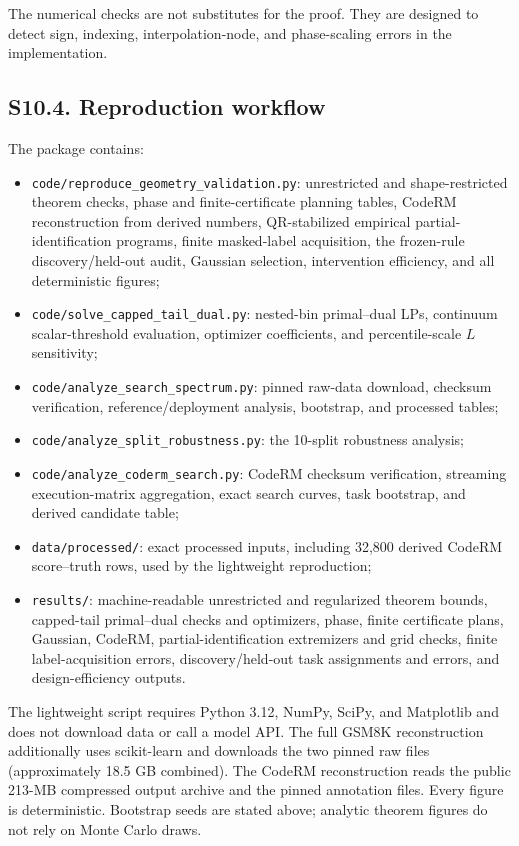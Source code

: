 The numerical checks are not substitutes for the proof. They are designed to detect sign, indexing, interpolation-node, and phase-scaling errors in the implementation.

\subsection*{S10.4. Reproduction workflow}

The package contains:
\begin{itemize}
\item \texttt{code/reproduce\_geometry\_validation.py}: unrestricted and shape-restricted theorem checks, phase and finite-certificate planning tables, CodeRM reconstruction from derived numbers, QR-stabilized empirical partial-identification programs, finite masked-label acquisition, the frozen-rule discovery/held-out audit, Gaussian selection, intervention efficiency, and all deterministic figures;
\item \texttt{code/solve\_capped\_tail\_dual.py}: nested-bin primal--dual LPs, continuum scalar-threshold evaluation, optimizer coefficients, and percentile-scale $L$ sensitivity;
\item \texttt{code/analyze\_search\_spectrum.py}: pinned raw-data download, checksum verification, reference/deployment analysis, bootstrap, and processed tables;
\item \texttt{code/analyze\_split\_robustness.py}: the 10-split robustness analysis;
\item \texttt{code/analyze\_coderm\_search.py}: CodeRM checksum verification, streaming execution-matrix aggregation, exact search curves, task bootstrap, and derived candidate table;
\item \texttt{data/processed/}: exact processed inputs, including 32,800 derived CodeRM score--truth rows, used by the lightweight reproduction;
\item \texttt{results/}: machine-readable unrestricted and regularized theorem bounds, capped-tail primal--dual checks and optimizers, phase, finite certificate plans, Gaussian, CodeRM, partial-identification extremizers and grid checks, finite label-acquisition errors, discovery/held-out task assignments and errors, and design-efficiency outputs.
\end{itemize}
The lightweight script requires Python 3.12, NumPy, SciPy, and Matplotlib and does not download data or call a model API. The full GSM8K reconstruction additionally uses scikit-learn and downloads the two pinned raw files (approximately 18.5 GB combined). The CodeRM reconstruction reads the public 213-MB compressed output archive and the pinned annotation files. Every figure is deterministic. Bootstrap seeds are stated above; analytic theorem figures do not rely on Monte Carlo draws.


